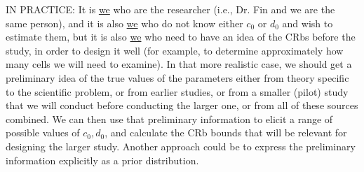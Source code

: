\documentclass[letterpaper, 12pt]{article}
\begin{document}
IN PRACTICE: It is \underline{we} who are the researcher (i.e., Dr. Fin and we are the same person), and it is also \underline{we}
who do not know either $c_0$ or $d_0$ and wish to estimate them, but it is also \underline{we} who need to have an idea of the
CRbs before the study, in order to design it well (for example, to determine approximately how many cells
we will need to examine). In that more realistic case, we should get a preliminary idea of the true values of
the parameters either from theory specific to the scientific problem, or from earlier studies, or from a smaller
(pilot) study that we will conduct before conducting the larger one, or from all of these sources combined.
We can then use that preliminary information to elicit a range of possible values of $c_0, d_0$, and calculate the
CRb bounds that will be relevant for designing the larger study. Another approach could be to express the
preliminary information explicitly as a prior distribution.
\end{document}

